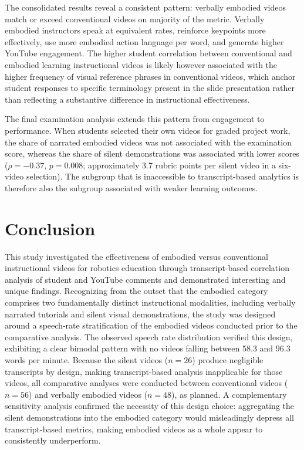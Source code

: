 \documentclass[fleqn,10pt]{JLA_article} %
\begin{document}
The consolidated results reveal a consistent pattern: verbally embodied videos match or exceed conventional videos on majority of the metric. Verbally embodied instructors speak at equivalent rates, reinforce keypoints more effectively, use more embodied action language per word, and generate higher YouTube engagement. The higher student correlation between conventional and embodied learning instructional videos is likely however associated with the higher frequency of visual reference phrases in conventional videos, which anchor student responses to specific terminology present in the slide presentation rather than reflecting a substantive difference in instructional effectiveness.

The final examination analysis extends this pattern from engagement to performance. When students selected their own videos for graded project work, the share of narrated embodied videos was not associated with the examination score, whereas the share of silent demonstrations was associated with lower scores ($\rho = -0.37$, $p = 0.008$; approximately 3.7 rubric points per silent video in a six-video selection). The subgroup that is inaccessible to transcript-based analytics is therefore also the subgroup associated with weaker learning outcomes.


\section{Conclusion}

This study investigated the effectiveness of embodied versus conventional instructional videos for robotics education through transcript-based correlation analysis of student and YouTube comments and demonstrated interesting and unique findings. Recognizing from the outset that the embodied category comprises two fundamentally distinct instructional modalities, including verbally narrated tutorials and silent visual demonstrations, the study was designed around a speech-rate stratification of the embodied videos conducted prior to the comparative analysis. The observed speech rate distribution verified this design, exhibiting a clear bimodal pattern with no videos falling between 58.3 and 96.3 words per minute. Because the silent videos ($n = 26$) produce negligible transcripts by design, making transcript-based analysis inapplicable for those videos, all comparative analyses were conducted between conventional videos ($n = 56$) and verbally embodied videos ($n = 48$), as planned. A complementary sensitivity analysis confirmed the necessity of this design choice: aggregating the silent demonstrations into the embodied category would misleadingly depress all transcript-based metrics, making embodied videos as a whole appear to consistently underperform.
\end{document}
